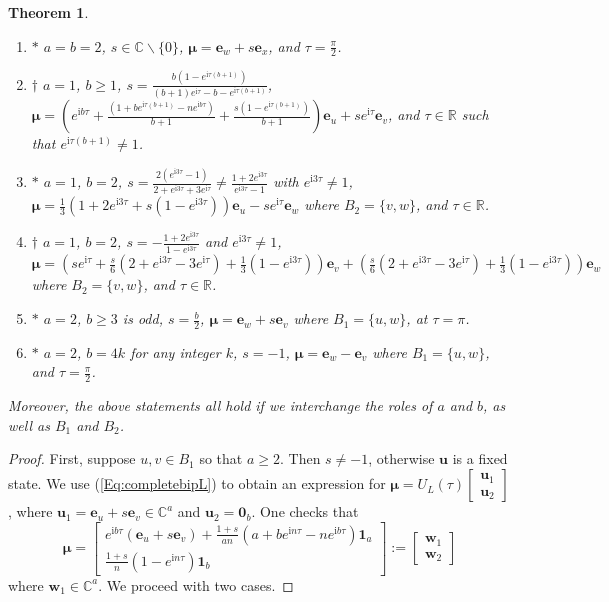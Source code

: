 \documentclass{article}
\numberwithin{equation}{section}
\newtheorem{theorem}[lemma]{Theorem}
\newcommand{\zero}{\mathbf 0}
\newcommand{\uno}{\mathbf 1}
\newcommand{\be}{\mathbf e}
\newcommand{\bu}{\mathbf u}
\newcommand{\bw}{\mathbf w}
\newcommand{\bmu}{{\boldsymbol{\mu}}}
\def\C{\mathbb{C}}
\def\R{\mathbb{R}}
\def\ii{\mathrm{i}}
\begin{document}
{\begin{theorem}
\begin{enumerate}
\begin{enumerate}
\item $*$ $a=b=2$, $s\in\C\backslash\{0\}$, $\bmu=\be_w+s\be_x$, and $\tau=\frac{\pi}{2}$.
\item $\dagger$ $a=1$, $b\geq 1$, $s=\frac{b(1-e^{\ii \tau (b+1)})}{(b+1)e^{\ii \tau}-b-e^{\ii \tau (b+1)}}$, $\bmu=\left(e^{\ii b \tau}+\frac{(1+be^{\ii \tau (b+1)}-ne^{\ii b \tau})}{b+1}+\frac{s(1-e^{\ii \tau (b+1)})}{b+1}\right)\be_u+se^{\ii \tau }\be_v$, and $\tau\in\R$ such that $e^{\ii\tau(b+1)}\neq 1$.
\item $*$ $a=1$, $b=2$, $s=\frac{2(e^{\ii 3\tau}-1)}{2+e^{\ii 3\tau}+3e^{\ii \tau}}\neq \frac{1+2e^{\ii 3\tau}}{e^{\ii 3\tau}-1}$ with $e^{\ii 3\tau}\neq 1$, $\bmu=\frac{1}{3}(1+2e^{\ii 3\tau}+s(1-e^{\ii 3\tau}))\be_u-se^{\ii \tau}\be_w$ where $B_2=\{v,w\}$, and $\tau\in\R$.
\item $\dagger$ $a=1$, $b=2$, $s=-\frac{1+2e^{\ii 3 \tau}}{1-e^{\ii 3 \tau}}$ and $e^{\ii 3 \tau}\neq 1$, $\bmu=\left(se^{\ii \tau}+\frac{s}{6}(2+e^{\ii 3 \tau}-3e^{\ii \tau})+\frac{1}{3}(1-e^{\ii 3 \tau})\right)\be_v+\left(\frac{s}{6}(2+e^{\ii 3 \tau}-3e^{\ii \tau})+\frac{1}{3}(1-e^{\ii 3 \tau})\right)\be_w$ where $B_2=\{v,w\}$, and $\tau\in\R$.
\item $*$ $a=2$, $b\geq 3$ is odd, $s=\frac{b}{2}$, $\bmu=\be_w+s\be_v$ where $B_1=\{u,w\}$, at $\tau=\pi$. 
\item $*$ $a=2$, $b=4k$ for any integer $k$, $s=-1$, $\bmu=\be_w-\be_v$ where $B_1=\{u,w\}$, and $\tau=\frac{\pi}{2}$.
\end{enumerate}
\end{enumerate}
Moreover, the above statements all hold if we interchange the roles of $a$ and $b$, as well as $B_1$ and $B_2$.
\end{theorem}

\begin{proof}
First, suppose $u,v\in B_1$ so that $a\geq 2$. Then $s\neq -1$, otherwise $\bu$ is a fixed state. We use (\ref{Eq:completebipL}) to obtain an expression for $\bmu=U_L(\tau)\begin{bmatrix}
\bu_1\\ \bu_2\end{bmatrix}$, where $\bu_1=\be_u+s\be_v\in\C^a$ and $\bu_2=\zero_b$. One checks that
\begin{equation*}
\bmu=\begin{bmatrix}
e^{\ii b \tau}(\be_u+s\be_v)+\frac{1+s}{an}(a+be^{\ii n \tau}-ne^{\ii b \tau})\uno_a\\ 
\frac{1+s}{n}(1-e^{\ii n \tau})\uno_b
\end{bmatrix}:=\begin{bmatrix}\bw_1\\\bw_2\end{bmatrix} 
\end{equation*}
where $\bw_1\in\C^a$. We proceed with two cases.


\end{proof}}
\end{document}
